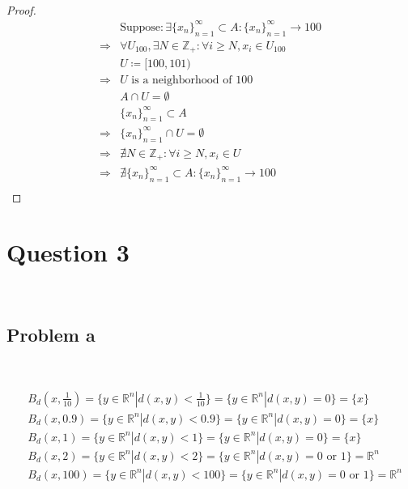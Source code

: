 \documentclass{article}
\begin{document}
~

\begin{proof}
    \begin{align*}
        &\text{Suppose}:\exists \{x_n\}^{\infty}_{n=1}\subset A:\{x_n\}^{\infty}_{n=1}\to 100\\
        \Rightarrow&\forall U_{100},\exists N\in \mathbb{Z} _+:\forall i \geqslant N,x_i\in U_{100} \\
        &U\coloneqq [100,101)\\
        \Rightarrow&U\text{ is a neighborhood of }100\\
        &A\cap U=\emptyset\\
        &\{x_n\}^\infty_{n=1}\subset A\\
        \Rightarrow&\{x_n\}^\infty_{n=1}\cap U=\emptyset\\
        \Rightarrow&\nexists N\in \mathbb{Z} _+:\forall i \geqslant N,x_i\in U\\
        \Rightarrow&\nexists \{x_n\}^{\infty}_{n=1}\subset A:\{x_n\}^{\infty}_{n=1}\to 100\\
    \end{align*}
\end{proof}

\newpage

\section*{Question 3}

~

\subsection*{Problem a}

~

\begin{equation*}
    \begin{split}
        &B_d(x,\frac{1}{10})=\{y\in\mathbb{R}^n|d(x,y)<\frac{1}{10}\}=\{y\in\mathbb{R}^n|d(x,y)=0\}=\{x\}\\
        &B_d(x,0.9)=\{y\in\mathbb{R}^n|d(x,y)<0.9\}=\{y\in\mathbb{R}^n|d(x,y)=0\}=\{x\}\\
        &B_d(x,1)=\{y\in\mathbb{R}^n|d(x,y)<1\}=\{y\in\mathbb{R}^n|d(x,y)=0\}=\{x\}\\
        &B_d(x,2)=\{y\in\mathbb{R}^n|d(x,y)<2\}=\{y\in\mathbb{R}^n|d(x,y)=0\text{ or }1\}=\mathbb{R} ^n\\
        &B_d(x,100)=\{y\in\mathbb{R}^n|d(x,y)<100\}=\{y\in\mathbb{R}^n|d(x,y)=0\text{ or }1\}=\mathbb{R} ^n\\
    \end{split}
\end{equation*}
\end{document}
